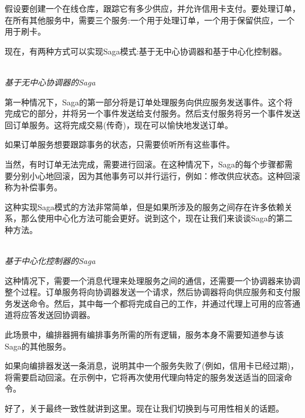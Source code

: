 假设要创建一个在线仓库，跟踪它有多少供应，并允许信用卡支付。要处理订单，在所有其他服务中，需要三个服务:一个用于处理订单，一个用于保留供应，一个用于刷卡。

现在，有两种方式可以实现Saga模式:基于无中心协调器和基于中心化控制器。

\hspace*{\fill} \\ %
\noindent
\textit{基于无中心协调器的Saga}

第一种情况下，Saga的第一部分将是订单处理服务向供应服务发送事件。这个将完成它的部分，并将另一个事件发送给支付服务。然后支付服务将另一个事件发送回订单服务。这将完成交易(传奇)，现在可以愉快地发送订单。

如果订单服务想要跟踪事务的状态，只需要侦听所有这些事件。

当然，有时订单无法完成，需要进行回滚。在这种情况下，Saga的每个步骤都需要分别小心地回滚，因为其他事务可以并行运行，例如：修改供应状态。这种回滚称为补偿事务。

这种实现Saga模式的方法非常简单，但是如果所涉及的服务之间存在许多依赖关系，那么使用中心化方法可能会更好。说到这个，现在让我们来谈谈Saga的第二种方法。

\hspace*{\fill} \\ %
\noindent
\textit{基于中心化控制器的Saga}

这种情况下，需要一个消息代理来处理服务之间的通信，还需要一个协调器来协调整个过程。订单服务将向协调器发送一个请求，然后协调器将向供应服务和支付服务发送命令。然后，其中每一个都将完成自己的工作，并通过代理上可用的应答通道将应答发送回协调器。

此场景中，编排器拥有编排事务所需的所有逻辑，服务本身不需要知道参与该Saga的其他服务。

如果向编排器发送一条消息，说明其中一个服务失败了(例如，信用卡已经过期)，将需要启动回滚。在示例中，它将再次使用代理向特定的服务发送适当的回滚命令。

好了，关于最终一致性就讲到这里。现在让我们切换到与可用性相关的话题。




